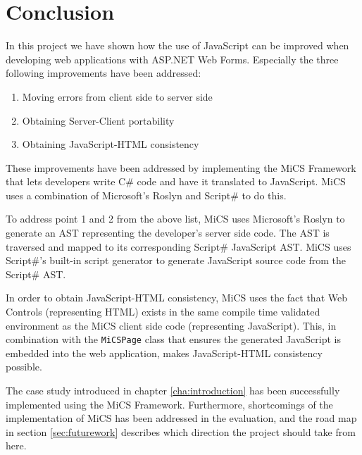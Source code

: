 \chapter{Conclusion}
In this project we have shown how the use of JavaScript can be improved when developing web applications with ASP.NET Web Forms. Especially the three following improvements have been addressed:

\begin{enumerate}
	\item Moving errors from client side to server side
	\item Obtaining Server-Client portability
	\item Obtaining JavaScript-HTML consistency
\end{enumerate}

These improvements have been addressed by implementing the MiCS Framework that lets developers write C\# code and have it translated to JavaScript. MiCS uses a combination of Microsoft's Roslyn and Script\# to do this. 

To address point 1 and 2 from the above list, MiCS uses Microsoft's Roslyn to generate an AST representing the developer's server side code. The AST is traversed and mapped to its corresponding Script\# JavaScript AST. MiCS uses Script\#'s built-in script generator to generate JavaScript source code from the Script\# AST. 

In order to obtain JavaScript-HTML consistency, MiCS uses the fact that Web Controls (representing HTML) exists in the same compile time validated environment as the MiCS client side code (representing JavaScript). This, in combination with the \texttt{MiCSPage} class that ensures the generated JavaScript is embedded into the web application, makes JavaScript-HTML consistency possible.

The case study introduced in chapter \ref{cha:introduction} has been successfully implemented using the MiCS Framework. Furthermore, shortcomings of the implementation of MiCS has been addressed in the evaluation, and the road map in section \ref{sec:futurework} describes which direction the project should take from here.
